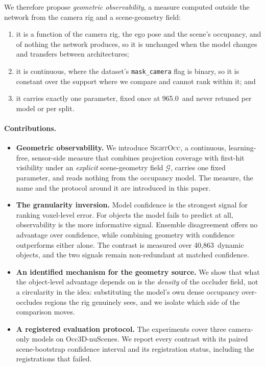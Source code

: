 \documentclass[10pt,twocolumn,letterpaper]{article}
\newcommand{\nObj}{40{,}863}
\newcommand{\fullpx}{965.0}
\begin{document}
We therefore propose \emph{geometric observability}, a measure computed
outside the network from the camera rig and a scene-geometry field:
\begin{enumerate}\itemsep0pt
\item it is a function of the camera rig, the ego pose and the scene's
      occupancy, and of nothing the network produces, so it is unchanged
      when the model changes and transfers between architectures;
\item it is continuous, where the dataset's \texttt{mask\_camera} flag is
      binary, so it is constant over the support where we
      compare and cannot rank within it; and
\item it carries exactly one parameter, fixed once at \fullpx\ and never
      retuned per model or per split.
\end{enumerate}

\paragraph{Contributions.}
\begin{itemize}\itemsep0pt
\item \textbf{Geometric observability.} We introduce \textsc{SightOcc}, a
      continuous, learning-free, sensor-side measure that combines
      projection coverage with first-hit visibility under an \emph{explicit}
      scene-geometry field $\mathcal{G}$, carries one fixed parameter, and
      reads nothing from the occupancy model. The measure, the name and the
      protocol around it are introduced in this paper.
\item \textbf{The granularity inversion.} Model confidence is the
      strongest signal for ranking voxel-level error. For objects the model
      fails to predict at all, observability is the more informative signal.
      Ensemble disagreement offers no advantage over confidence, while
      combining geometry with confidence outperforms either alone. The
      contrast is measured over \nObj\ dynamic objects, and the two signals
      remain non-redundant at matched confidence.
\item \textbf{An identified mechanism for the geometry source.} We show
      that what the object-level advantage depends on is the \emph{density}
      of the occluder field, not a circularity in the idea: substituting the
      model's own dense occupancy over-occludes regions the rig genuinely
      sees, and we isolate which side of the comparison moves.
\item \textbf{A registered evaluation protocol.} The experiments cover
      three camera-only models on Occ3D-nuScenes. We report every contrast
      with its paired scene-bootstrap confidence interval and its
      registration status, including the registrations that failed.
\end{itemize}
\end{document}
